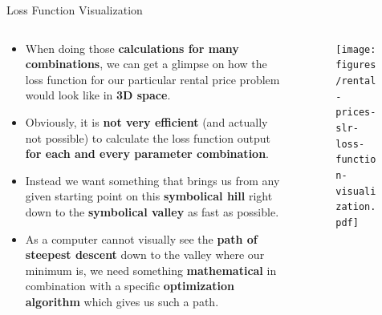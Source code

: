 \documentclass[main.tex]{subfiles}
\begin{document}
    \begin{frame}{Loss Function Visualization}
        \begin{columns}
            \begin{column}{0.6\textwidth}
                \begin{itemize}
                    \item When doing those \textbf{calculations for many combinations}, we can get a glimpse on how the loss function for our particular rental price problem would look like in \textbf{3D space}.
                    \item Obviously, it is \textbf{not very efficient} (and actually not possible) to calculate the loss function output \textbf{for each and every parameter combination}.
                    \item Instead we want something that brings us from any given starting point on this \textbf{symbolical hill} right down to the \textbf{symbolical valley} as fast as possible.
                    \item As a computer cannot visually see the \textbf{path of steepest descent} down to the valley where our minimum is, we need something \textbf{mathematical} in combination with a specific \textbf{optimization algorithm} which gives us such a path.
                \end{itemize}
            \end{column}
            \begin{column}{0.4\textwidth}
                \begin{figure}
                    \label{fig:rental-prices-slr-loss-function-visualization}
                    \texttt{[image: figures/rental-prices-slr-loss-function-visualization.pdf]}
                \end{figure}
            \end{column}
        \end{columns}
    \end{frame}
\end{document}
